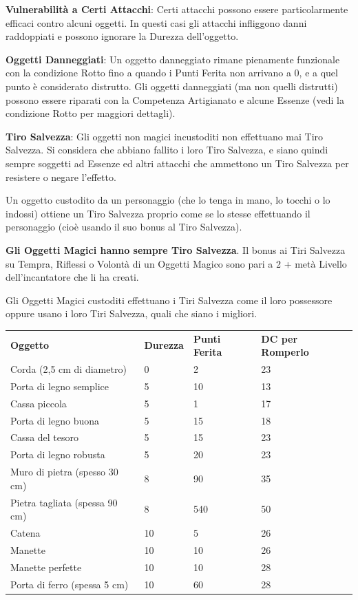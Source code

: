 \documentclass[a4paper,11pt,twoside,openany]{book}
\begin{document}
\textbf{Vulnerabilità a Certi Attacchi}: Certi attacchi possono essere particolarmente efficaci contro alcuni oggetti. In questi casi gli attacchi infliggono danni raddoppiati e possono ignorare la Durezza dell'oggetto.

\textbf{Oggetti Danneggiati}: Un oggetto danneggiato rimane pienamente funzionale con la condizione Rotto fino a quando i Punti Ferita non arrivano a 0, e a quel punto è considerato distrutto. Gli oggetti danneggiati (ma non quelli distrutti) possono essere riparati con la Competenza Artigianato e alcune Essenze (vedi la condizione Rotto per maggiori dettagli).

\textbf{Tiro Salvezza}: Gli oggetti non magici incustoditi non effettuano mai Tiro Salvezza. Si considera che abbiano fallito i loro Tiro Salvezza, e siano quindi sempre soggetti ad Essenze ed altri attacchi che ammettono un Tiro Salvezza per resistere o negare l'effetto.

Un oggetto custodito da un personaggio (che lo tenga in mano, lo tocchi o lo indossi) ottiene un Tiro Salvezza proprio come se lo stesse effettuando il personaggio (cioè usando il suo bonus al Tiro Salvezza).

\textbf{Gli Oggetti Magici hanno sempre Tiro Salvezza}. Il bonus ai Tiri Salvezza su Tempra, Riflessi o Volontà di un Oggetti Magico sono pari a 2 + metà Livello dell'incantatore che li ha creati.

Gli Oggetti Magici custoditi effettuano i Tiri Salvezza come il loro possessore oppure usano i loro Tiri Salvezza, quali che siano i migliori.

\bigskip

\begin{tabular}{L{6cm} L{3cm} L{3cm} L{3cm}}
	\toprule
	\textbf{Oggetto}& \textbf{Durezza} & \textbf{Punti Ferita} & \textbf{DC per Romperlo}\tabularnewline
	Corda (2,5 cm di diametro)     & 0      & 2           & 23\tabularnewline
	Porta di legno semplice        & 5      & 10          & 13\tabularnewline
	Cassa piccola                  & 5      & 1           & 17\tabularnewline
	Porta di legno buona           & 5      & 15          & 18\tabularnewline
	Cassa del tesoro               & 5      & 15          & 23\tabularnewline
	Porta di legno robusta         & 5      & 20          & 23\tabularnewline
	Muro di pietra (spesso 30 cm)  & 8      & 90          & 35\tabularnewline
	Pietra tagliata (spessa 90 cm) & 8      & 540         & 50\tabularnewline
	Catena                         & 10     & 5           & 26\tabularnewline
	Manette                        & 10     & 10          & 26\tabularnewline
	Manette perfette               & 10     & 10          & 28\tabularnewline
	Porta di ferro (spessa 5 cm)   & 10     & 60          & 28\tabularnewline
\end{tabular}
\end{document}

